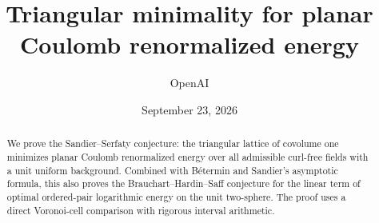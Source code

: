 \documentclass[11pt,a4paper]{article}
\title{Triangular minimality for planar Coulomb renormalized energy}
\author{OpenAI}
\date{September 23, 2026}
\theoremstyle{definition}
\theoremstyle{remark}
\numberwithin{equation}{section}
\begin{document}
\maketitle
\begin{abstract}
We prove the Sandier--Serfaty conjecture: the triangular lattice of
covolume one minimizes planar Coulomb renormalized energy over all admissible
curl-free fields with a unit uniform background. Combined with B\'etermin and
Sandier's asymptotic formula, this also proves the Brauchart--Hardin--Saff
conjecture for the linear term of optimal ordered-pair logarithmic energy on
the unit two-sphere. The proof uses a direct Voronoi-cell comparison with
rigorous interval arithmetic.
\end{abstract}
\tableofcontents
\clearpage







\appendix



\end{document}

